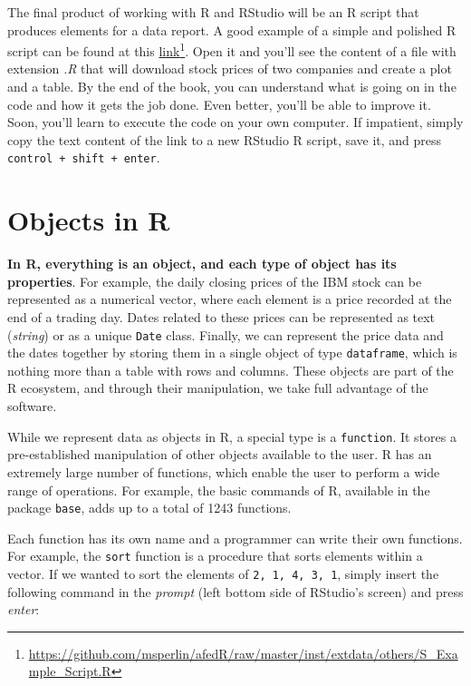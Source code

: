 \documentclass[
  12pt,
]{book}
\begin{document}
The final product of working with R and RStudio will be an R script that produces elements for a data report. A good example of a simple and polished R script can be found at this \href{https://github.com/msperlin/afedR/raw/master/inst/extdata/others/S_Example_Script.R}{link}\footnote{\url{https://github.com/msperlin/afedR/raw/master/inst/extdata/others/S_Example_Script.R}}. Open it and you'll see the content of a file with extension \emph{.R} that will download stock prices of two companies and create a plot and a table. By the end of the book, you can understand what is going on in the code and how it gets the job done. Even better, you'll be able to improve it. Soon, you'll learn to execute the code on your own computer. If impatient, simply copy the text content of the link to a new RStudio R script, save it, and press \texttt{control\ +\ shift\ +\ enter}.

\hypertarget{objects-in-r}{%
\section{Objects in R}\label{objects-in-r}}

\textbf{In R, everything is an object, and each type of object has its properties}. For example, the daily closing prices of the IBM stock can be represented as a numerical vector, where each element is a price recorded at the end of a trading day. Dates related to these prices can be represented as text (\emph{string}) or as a unique \texttt{Date} class. Finally, we can represent the price data and the dates together by storing them in a single object of type \texttt{dataframe}, which is nothing more than a table with rows and columns. These objects are part of the R ecosystem, and through their manipulation, we take full advantage of the software.

While we represent data as objects in R, a special type is a \texttt{function}. It stores a pre-established manipulation of other objects available to the user. R has an extremely large number of functions, which enable the user to perform a wide range of operations. For example, the basic commands of R, available in the package \texttt{base}, adds up to a total of 1243 functions.

Each function has its own name and a programmer can write their own functions. For example, the \texttt{sort} function is a procedure that sorts elements within a vector. If we wanted to sort the elements of \texttt{2,\ 1,\ 4,\ 3,\ 1}, simply insert the following command in the \emph{prompt} (left bottom side of RStudio's screen) and press \emph{enter}:  
\end{document}
